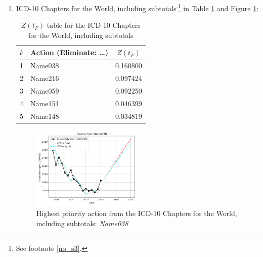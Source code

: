 \documentclass[10pt, a4paper, twocolumn]{IEEEconf}
\begin{document}
\begin{enumerate}
  \item ICD-10 Chapters for the World, including subtotals\cite{whomortality}\textsuperscript{,}\footnote{See footnote \ref{no_s3}.} in Table \ref{table:ztable9} and Figure \ref{fig:k9}:
    \begin{table}[H]
      \centering
      \begin{tabular}{clc}
        \toprule
          $k$ & Action (Eliminate: \ldots) & $Z(t_F)$ \\
        \midrule
          1   & Name038 & 0.160800 \\
          2   & Name216 & 0.097424 \\
          3   & Name059 & 0.092250 \\
          4   & Name151 & 0.046399 \\
          5   & Name148 & 0.034819 \\
        \bottomrule
      \end{tabular}
      \caption{$Z(t_F)$ table for the ICD-10 Chapters for the World, including subtotals}
      \label{table:ztable9}
    \end{table}
    \begin{figure}[H]
      \centering
      \includegraphics[width=0.5\textwidth]{results/WORLD_ICD10_CHAPTERS_ALL/Name038_ets.png}
      \caption{Highest priority action from the ICD-10 Chapters for the World, including subtotals: \textit{Name038}}\label{fig:k9}
    \end{figure}
  

\end{enumerate}
\end{document}

